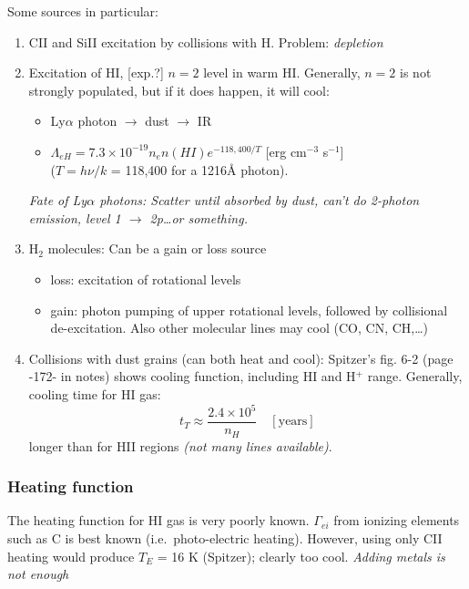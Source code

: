 \documentclass[11pt]{article}
\newcommand{\mar}[1]{\hspace{0pt}\marginpar{-\textcolor{black}{#1}-}}
\newcommand{\mynotes}[1]{{\fontfamily{cmss}\selectfont \textit{#1}}}
\begin{document}
\mar{161}Some sources in particular:
\begin{enumerate}
    \item CII and SiII excitation by collisions with H. Problem: \emph{depletion}
    \item Excitation of HI, [exp.?] $n=2$ level in warm HI.
        Generally, $n=2$ is not strongly populated, but if it does happen,
        it will cool:
        \begin{itemize}[itemsep=0ex]
            \item Ly$\alpha$ photon $\rightarrow$ dust $\rightarrow$ IR
            \item $\Lambda_{eH} = 7.3\times10^{-19} n_{e}n(HI)
                e^{-118,400/T} $ [erg cm$^{-3}$ s$^{-1}$]\\
                ($T = h\nu/k$ = 118,400 for a 1216\AA{} photon).
        \end{itemize}
        \mynotes{Fate of Ly$\alpha$ photons: Scatter until absorbed by dust,
        can't do 2-photon emission, level 1 $\rightarrow$ 2p\ldots or something.}
    \item H$_{2}$ molecules: Can be a gain or loss source
        \begin{itemize}
            \item loss: excitation of rotational levels
            \item gain: photon pumping of upper rotational levels, followed by
                collisional de-excitation.
                Also other molecular lines may cool (CO, CN, CH,\ldots)
        \end{itemize}
    \item Collisions with dust grains (can both heat and cool):
        Spitzer's fig. 6-2 (page -172- in notes) shows cooling function,
        including HI and H$^{+}$ range.
        Generally, cooling time for HI gas:
        \[
            t_{T} \approx \frac{2.4\times10^{5}}{n_{H}} \quad [\mathrm{years}]
            \]
        longer than for HII regions \mynotes{(not many lines available)}.
\end{enumerate}

\subsubsection{Heating function}
The heating function for HI gas is very poorly known. $\Gamma_{ei}$ from
ionizing elements such as C is best known (i.e.\ photo-electric heating).
\mar{162}However, using only CII heating would produce $T_{E}$ = 16 K
(Spitzer); clearly too cool. \mynotes{Adding metals is not enough}
\end{document}
